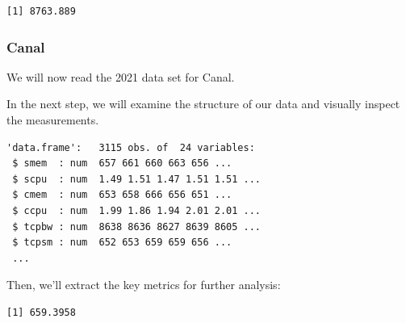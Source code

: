 \begin{verbatim}
[1] 8763.889
\end{verbatim}

\subsubsection{Canal}

We will now read the 2021 data set for Canal.

\begin{Shaded}
\begin{Highlighting}[]
\OtherTok{\textless{}{-}} 
\OtherTok{\textless{}{-}} \NormalTok{(}\NormalTok{,}\NormalTok{))}
\end{Highlighting}
\end{Shaded}

In the next step, we will examine the structure of our data and visually
inspect the measurements.

\begin{Shaded}
\begin{Highlighting}[]
\end{Highlighting}
\end{Shaded}

\begin{verbatim}
'data.frame':   3115 obs. of  24 variables:
 $ smem  : num  657 661 660 663 656 ...
 $ scpu  : num  1.49 1.51 1.47 1.51 1.51 ...
 $ cmem  : num  653 658 666 656 651 ...
 $ ccpu  : num  1.99 1.86 1.94 2.01 2.01 ...
 $ tcpbw : num  8638 8636 8627 8639 8605 ...
 $ tcpsm : num  652 653 659 659 656 ...
 ...
\end{verbatim}

Then, we'll extract the key metrics for further analysis:

\begin{Shaded}
\begin{Highlighting}[]
\SpecialCharTok{\$}
\end{Highlighting}
\end{Shaded}

\begin{verbatim}
[1] 659.3958
\end{verbatim}

\begin{Shaded}
\begin{Highlighting}[]
\SpecialCharTok{\$}
\end{Highlighting}
\end{Shaded}

